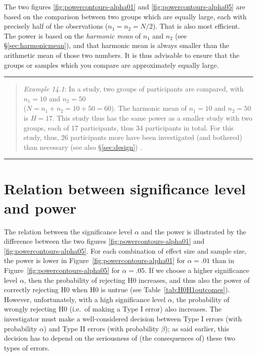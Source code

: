 \documentclass[
]{book}
\begin{document}
The two figures \ref{fig:powercontours-alpha01} and
\ref{fig:powercontours-alpha05} are based on the comparison between two groups which are equally large, each with
precisely half of the observations (\(n_1=n_2=N/2\)). That is also most efficient.
The power is based on the \emph{harmonic mean} of \(n_1\) and \(n_2\) (see §\ref{sec:harmonicmean}), and
that harmonic mean is always smaller than the arithmetic mean of those two numbers. It is thus
advisable to ensure that the groups or samples which you compare are approximately equally large.

\begin{center}\rule{0.5\linewidth}{0.5pt}\end{center}

\begin{quote}
\emph{Example 14.1}: In a study, two groups of participants are compared, with \(n_1=10\) and \(n_2=50\)\\
(\(N=n_1+n_2=10+50=60\)). The harmonic mean of \(n_1=10\) and \(n_2=50\) is \(H=17\). This study thus has the same
power as a smaller study with two groups, each of 17 participants, thus 34 participants in total. For this
study, thus, 26 participants more have been investigated (and bothered)
than necessary (see also §\ref{sec:design}) \citep[p.295]{ACA11}.
\end{quote}

\begin{center}\rule{0.5\linewidth}{0.5pt}\end{center}

\hypertarget{sec:significancelevel-power}{%
\section{Relation between significance level and power}\label{sec:significancelevel-power}}

The relation between the significance level \(\alpha\) and the power is
illustrated by the difference between the two figures
\ref{fig:powercontours-alpha01} and
\ref{fig:powercontours-alpha05}. For each combination of effect size
and sample size, the power is lower in
Figure~\ref{fig:powercontours-alpha01} for \(\alpha=.01\) than in
Figure~\ref{fig:powercontours-alpha05} for \(\alpha=.05\). If we choose a higher
significance level \(\alpha\), then the probability of rejecting H0
increases, and thus also the power of correctly rejecting H0 when H0
is untrue (see Table~\ref{tab:H0H1outcomes}).
However, unfortunately, with a high significance
level \(\alpha\), the probability of wrongly rejecting H0 (i.e.~of making a
Type I error) also increases. The investigator
must make a well-considered decision between Type I errors (with
probability \(\alpha\)) and Type II errors (with probability \(\beta\)); as said earlier,
this decision has to depend on the seriousness of (the consequences of) these
two types of errors.
\end{document}
